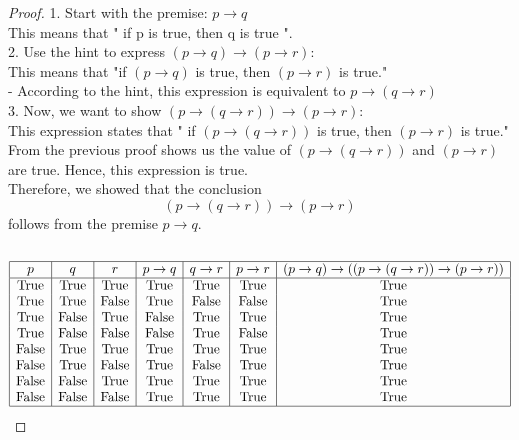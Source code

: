 \documentclass[11pt]{article}
\begin{document}
\begin{enumerate}
\begin{proof}
1. Start with the premise: \( p \rightarrow q \)\\
    This means that " if p is true, then q is true ".\\
2. Use the hint to express \( (p \rightarrow q) \rightarrow (p \rightarrow r) \):\\
    This means that "if $(p \rightarrow q)$ is true, then $(p \rightarrow r)$ is true."\\
  - According to the hint, this expression is equivalent to \( p \rightarrow (q \rightarrow r) \)\\
3. Now, we want to show \( (p \rightarrow (q \rightarrow r)) \rightarrow (p \rightarrow r) \):\\
This expression states that " if $(p \rightarrow (q \rightarrow r))$ is true, then $ (p \rightarrow r)$ is true."\\
    From the previous proof shows us the value of $(p \rightarrow (q \rightarrow r))$ and  $ (p \rightarrow r)$ are true. Hence, this expression is true.\\
     Therefore, we showed that the conclusion \[(p \rightarrow (q \rightarrow r)) \rightarrow (p \rightarrow r)\]
  follows from the premise $p \rightarrow q$.\\
  \\
  \[
\begin{array}{|c|c|c|c|c|c|c|}
\hline
p & q & r & p \rightarrow q & q \rightarrow r & p \rightarrow r & (p \rightarrow q) \rightarrow ((p \rightarrow (q \rightarrow r)) \rightarrow (p \rightarrow r)) \\
\hline
\text{True} & \text{True} & \text{True} & \text{True} & \text{True} & \text{True} &  \text{True} \\
\text{True} & \text{True} & \text{False} & \text{True} & \text{False} & \text{False} &  \text{True} \\
\text{True} & \text{False} & \text{True} & \text{False} & \text{True} & \text{True} &  \text{True} \\
\text{True} & \text{False} & \text{False} & \text{False} & \text{True} & \text{False} & \text{True} \\
\text{False} & \text{True} & \text{True} & \text{True} & \text{True} & \text{True} & \text{True} \\
\text{False} & \text{True} & \text{False} & \text{True} & \text{False} & \text{True} & \text{True} \\
\text{False} & \text{False} & \text{True} & \text{True} & \text{True} & \text{True} &  \text{True} \\
\text{False} & \text{False} & \text{False} & \text{True} & \text{True} & \text{True} &  \text{True} \\
\hline
\end{array}
\]



\end{proof}
\end{enumerate}
\end{document}
